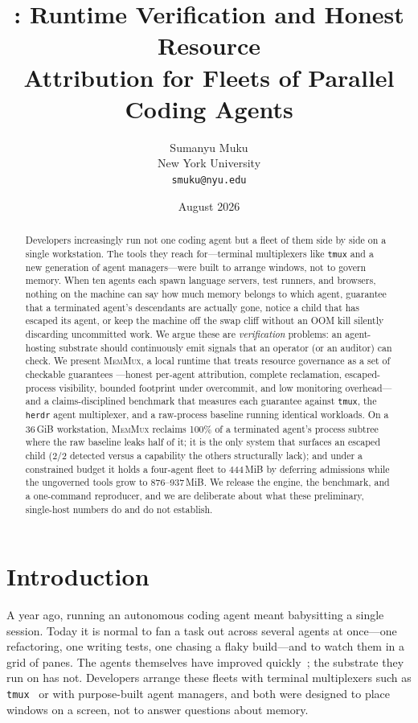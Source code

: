 \documentclass[11pt]{article}
\title{\textbf{\sys{}: Runtime Verification and Honest Resource\\
Attribution for Fleets of Parallel Coding Agents}}
\author{
  Sumanyu Muku\\
  New York University\\
  \texttt{smuku@nyu.edu}
}
\date{August 2026}
\newcommand{\sys}{\textsc{MemMux}}
\newcommand{\code}[1]{\texttt{#1}}
\begin{document}
\maketitle
\thispagestyle{fancy}

\begin{abstract}
Developers increasingly run not one coding agent but a fleet of them side by side on a single
workstation. The tools they reach for---terminal multiplexers like \code{tmux} and a new
generation of agent managers---were built to arrange windows, not to govern memory. When ten
agents each spawn language servers, test runners, and browsers, nothing on the machine can say how
much memory belongs to which agent, guarantee that a terminated agent's descendants are actually
gone, notice a child that has escaped its agent, or keep the machine off the swap cliff without an
OOM kill silently discarding uncommitted work. We argue these are \emph{verification} problems: an
agent-hosting substrate should continuously emit signals that an operator (or an auditor) can check.
We present \sys{}, a local runtime that treats resource governance as a set of checkable guarantees
---honest per-agent attribution, complete reclamation, escaped-process visibility, bounded footprint
under overcommit, and low monitoring overhead---and a claims-disciplined benchmark that measures each
guarantee against \code{tmux}, the \code{herdr} agent multiplexer, and a raw-process baseline running
identical workloads. On a 36\,GiB workstation, \sys{} reclaims 100\% of a terminated agent's process
subtree where the raw baseline leaks half of it; it is the only system that surfaces an escaped
child (2/2 detected versus a capability the others structurally lack); and under a constrained budget
it holds a four-agent fleet to 444\,MiB by deferring admissions while the ungoverned tools grow to
876--937\,MiB. We release the engine, the benchmark, and a one-command reproducer, and we are
deliberate about what these preliminary, single-host numbers do and do not establish.
\end{abstract}

\section{Introduction}

A year ago, running an autonomous coding agent meant babysitting a single session. Today it is
normal to fan a task out across several agents at once---one refactoring, one writing tests, one
chasing a flaky build---and to watch them in a grid of panes. The agents themselves have improved
quickly~\citep{yao2023react,shinn2023reflexion,jimenez2024swebench,yang2024sweagent}; the substrate
they run on has not. Developers arrange these fleets with terminal multiplexers such as
\code{tmux}~\citep{tmux} or with purpose-built agent managers, and both were designed to place
windows on a screen, not to answer questions about memory.
\end{document}
